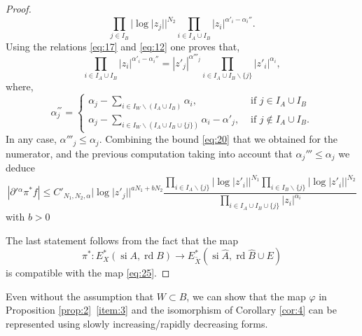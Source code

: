 \documentclass[11pt,a4paper]{amsart}
\DeclareMathOperator{\si}{si}
\DeclareMathOperator{\rd}{rd}
\numberwithin{equation}{section}
\theoremstyle{plain}
\theoremstyle{definition}
\begin{document}
\begin{proof}
\begin{displaymath}
{      \prod_{j\in I_B}|\log|z_j||^{N_2}}
    {\prod_{i\in I_{A}\cup I_{B}}|z_{i}|^{\alpha' _{i}-\alpha _{i}''}}.
  \end{displaymath}
  Using the relations \eqref{eq:17} and \eqref{eq:12} one proves
  that,
  \begin{displaymath}
    \prod_{i\in I_{A}\cup I_{B}}|z_{i}|^{\alpha' _{i}-\alpha _{i}''}=
    |z'_{j}|^{\alpha''' _{j}}\prod_{i\in I_{A}\cup I_{B}\smallsetminus \{j\}}|z'_{i}|^{\alpha_{i}},
  \end{displaymath}
where, 
\begin{displaymath}
  \alpha ^{'''}_{j}=
  \begin{cases}
    \alpha _{j}-\sum_{i\in I_{W}\smallsetminus (I_{A}\cup
    I_{B})}\alpha _{i}, &\text{ if }j\in I_{A}\cup I_{B}\\
    \alpha _{j}-\sum_{i\in I_{W}\smallsetminus (I_{A}\cup
    I_{B}\cup \{j\})}\alpha _{i}-\alpha '_{j}, &\text{ if }j\not \in
                                                 I_{A}\cup I_{B}.
  \end{cases}
\end{displaymath}
In any case, $\alpha '''_{j}\le \alpha _{j}$.  Combining the bound
 \eqref{eq:20} that we obtained for the numerator, and the previous
 computation taking into account that $\alpha _{j}'''\le \alpha _{j}$
 we deduce
 \begin{displaymath}
   \left |\partial'{} ^{\alpha }\pi ^{\ast }f\right |\le
   C'_{N_{1},N_{2},\alpha }|\log|z'_j||^{aN_{1}+bN_2}\frac 
    {\displaystyle  \prod_{i\in I_A\smallsetminus \{j\}}|\log|z'_i||^{N_1}
   \prod_{i\in I_{B}\smallsetminus
     \{j\}}|\log|z'_i||^{N_2}}{\displaystyle  \prod_{i\in I_{A}\cup
     I_{B}\cup\{j\}}|z_{i}|^{\alpha _{i}}} 
 \end{displaymath}
 with $b> 0$


The last statement follows from the fact that the map
 \begin{displaymath}
 \pi ^{\ast}\colon E_{X}^\ast(\si A,\rd B) \to  E_{\widetilde X}^\ast(\si \widehat A,\rd
 \widehat B\cup E)
 \end{displaymath}
  is compatible with the map \eqref{eq:25}.
\end{proof}

Even without the assumption that $W\subset B$, we can show that the map $\varphi$ in Proposition
\ref{prop:2}~\ref{item:3} and the isomorphism of Corollary \ref{cor:4}
can be represented using slowly
increasing/rapidly decreasing forms.
\end{document}
